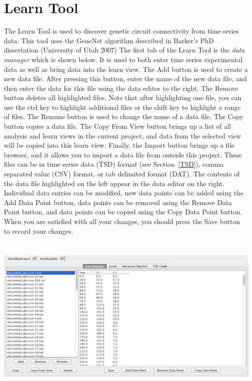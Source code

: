 \documentclass[titlepage,11pt]{article}
\begin{document}
\clearpage

\section{\label{Learn}Learn Tool}

\noindent
The Learn Tool is used to discover genetic circuit connectivity from time series data.  This tool uses the GeneNet algorithm described in
Barker's PhD dissertation (University of Utah 2007)
The first tab of the Learn Tool is the \emph{data manager} which is shown below.  It is used to both enter time series experimental data as well as bring data into the learn view.  The Add button is used to create a new data file. After pressing this button, enter the name of the new data file, and then enter the data for this file using the data editor to the right.  The Remove button deletes all highlighted files.  Note that after highlighting one file, you can use the ctrl key to highlight additional files or the shift key to highlight a range of files.  The Rename button is used to change the name of a data file. The Copy button copies a data file. The Copy From View button brings up a list of all analysis and learn views in the current project, and data from the selected view will be copied into this learn view.  Finally, the Import button brings up a file browser, and it allows you to import a data file from outside
this project.  These files can be in time series data (TSD) format (see Section~\ref{TSD}), comma separated value (CSV) format, or tab delimited format (DAT).  
The contents of the data file highlighted on the left appear in the data editor on the right.  Individual data entries can be modified, new data points can be added using the Add Data Point button, data points can be removed using the Remove Data Point button, and data points can be copied using the Copy Data Point button.  When you are
satisfied with all your changes, you should press the Save button to record your changes.

\begin{center}
\includegraphics[height=80mm]{screenshots/dataManager}
\end{center}
\end{document}
